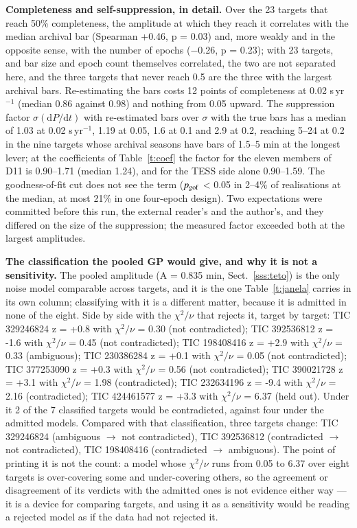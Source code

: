\documentclass{aa}
\begin{document}
\textbf{Completeness and self-suppression, in detail.} Over the 23 targets that reach 50\% completeness, the amplitude at which they reach it correlates with the median archival bar (Spearman +0.46, p = 0.03) and, more weakly and in the opposite sense, with the number of epochs ($-$0.26, p = 0.23); with 23 targets, and bar size and epoch count themselves correlated, the two are not separated here, and the three targets that never reach 0.5 are the three with the largest archival bars. Re-estimating the bars costs 12 points of completeness at 0.02 s\,yr$^{-1}$ (median 0.86 against 0.98) and nothing from 0.05 upward. The suppression factor $\sigma(\mathrm{d}P/\mathrm{d}t)$ with re-estimated bars over $\sigma$ with the true bars has a median of 1.03 at 0.02 s\,yr$^{-1}$, 1.19 at 0.05, 1.6 at 0.1 and 2.9 at 0.2, reaching 5--24 at 0.2 in the nine targets whose archival seasons have bars of 1.5--5 min at the longest lever; at the coefficients of Table~\ref{t:coef} the factor for the eleven members of D11 is 0.90--1.71 (median 1.24), and for the TESS side alone 0.90--1.59. The goodness-of-fit cut does not see the term ($p_{\rm gof}$ < 0.05 in 2--4\% of realisations at the median, at most 21\% in one four-epoch design). Two expectations were committed before this run, the external reader's and the author's, and they differed on the size of the suppression; the measured factor exceeded both at the largest amplitudes.

\textbf{The classification the pooled GP would give, and why it is not a sensitivity.} The pooled amplitude (A = 0.835 min, Sect.~\ref{sss:teto}) is the only noise model comparable across targets, and it is the one Table~\ref{t:janela} carries in its own column; classifying with it is a different matter, because it is admitted in none of the eight. Side by side with the $\chi^2/\nu$ that rejects it, target by target: TIC 329246824 z = +0.8 with $\chi^2/\nu$ = 0.30 (not contradicted); TIC 392536812 z = -1.6 with $\chi^2/\nu$ = 0.45 (not contradicted); TIC 198408416 z = +2.9 with $\chi^2/\nu$ = 0.33 (ambiguous); TIC 230386284 z = +0.1 with $\chi^2/\nu$ = 0.05 (not contradicted); TIC 377253090 z = +0.3 with $\chi^2/\nu$ = 0.56 (not contradicted); TIC 390021728 z = +3.1 with $\chi^2/\nu$ = 1.98 (contradicted); TIC 232634196 z = -9.4 with $\chi^2/\nu$ = 2.16 (contradicted); TIC 424461577 z = +3.3 with $\chi^2/\nu$ = 6.37 (held out). Under it 2 of the 7 classified targets would be contradicted, against four under the admitted models. Compared with that classification, three targets change: TIC 329246824 (ambiguous $\rightarrow$ not contradicted), TIC 392536812 (contradicted $\rightarrow$ not contradicted), TIC 198408416 (contradicted $\rightarrow$ ambiguous). The point of printing it is not the count: a model whose $\chi^2/\nu$ runs from 0.05 to 6.37 over eight targets is over-covering some and under-covering others, so the agreement or disagreement of its verdicts with the admitted ones is not evidence either way --- it is a device for comparing targets, and using it as a sensitivity would be reading a rejected model as if the data had not rejected it.
\end{document}
